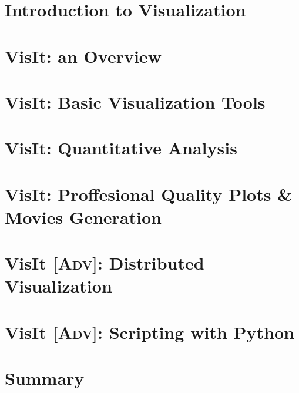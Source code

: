 \documentclass[xcolor=svgnames]{beamer}
\providecommand{\sectionpage}{\Large\centering \bf\mediumblue\insertsection}
\begin{document}
\section{Introduction to Visualization}
\frame{\sectionpage}

\section{VisIt: an Overview}
\frame{\sectionpage}

\section{VisIt: Basic Visualization Tools}
\frame{\sectionpage}

\section{VisIt: Quantitative Analysis}
\frame{\sectionpage}

\section{VisIt: Proffesional Quality Plots \& Movies Generation}
\frame{\sectionpage}

\section{VisIt {[}\textsc{Adv}{]}: Distributed Visualization}
\frame{\sectionpage}

\section{VisIt {[}\textsc{Adv}{]}: Scripting with Python}
\frame{\sectionpage}

\section{Summary}
\frame{\sectionpage}

\end{document}
